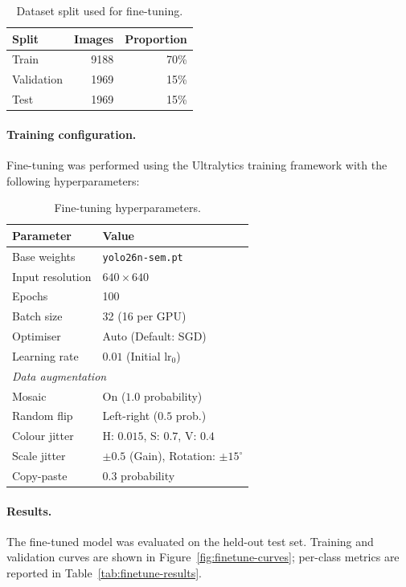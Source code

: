 \documentclass{article}
\begin{document}
\begin{table}[H]
\centering
\caption{Dataset split used for fine-tuning.}
\label{tab:dataset-split}
\begin{tabular}{lrr}
\toprule
\textbf{Split} & \textbf{Images} & \textbf{Proportion} \\
\midrule
Train      & 9188 & 70\% \\
Validation & 1969 & 15\% \\
Test       & 1969 & 15\% \\
\bottomrule
\end{tabular}
\end{table}

\paragraph{Training configuration.}
Fine-tuning was performed using the Ultralytics training framework with the following
hyperparameters:

\begin{table}[H]
\centering
\caption{Fine-tuning hyperparameters.}
\label{tab:finetune-config}
\begin{tabular}{ll}
\toprule
\textbf{Parameter} & \textbf{Value} \\
\midrule
Base weights     & \texttt{yolo26n-sem.pt} \\
Input resolution & $640 \times 640$ \\
Epochs           & 100 \\
Batch size       & 32 (16 per GPU) \\
Optimiser        & Auto (Default: SGD) \\
Learning rate    & $0.01$ (Initial $\text{lr}_0$) \\
\midrule
\multicolumn{2}{l}{\textit{Data augmentation}} \\
Mosaic           & On ($1.0$ probability) \\
Random flip      & Left-right ($0.5$ prob.) \\
Colour jitter    & H: $0.015$, S: $0.7$, V: $0.4$ \\
Scale jitter     & $\pm 0.5$ (Gain), Rotation: $\pm 15^\circ$ \\
Copy-paste       & $0.3$ probability \\
\bottomrule
\end{tabular}
\end{table}

\paragraph{Results.}
The fine-tuned model was evaluated on the held-out test set. Training and validation
curves are shown in Figure~\ref{fig:finetune-curves}; per-class metrics are reported
in Table~\ref{tab:finetune-results}.
\end{document}
